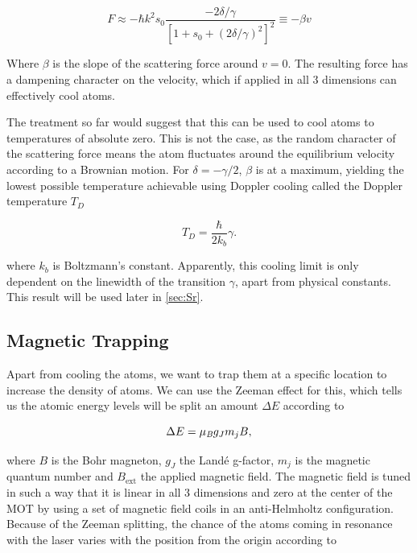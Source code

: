 \begin{equation}\label{eq:linearize}
	F \approx - \hbar k^2 s_0 \frac{-2\delta/\gamma}{\left[1+s_0+(2\delta/\gamma)^2\right]^2} \equiv -\beta v
\end{equation}

Where $\beta$ is the slope of the scattering force around $v=0$. The resulting force has a dampening character on the velocity, which if applied in all 3 dimensions can effectively cool atoms. 

The treatment so far would suggest that this can be used to cool atoms to temperatures of absolute zero. This is not the case, as the random character of the scattering force means the atom fluctuates around the equilibrium velocity according to a Brownian motion. For $\delta=-\gamma/2$, $\beta$ is at a maximum, yielding the lowest possible temperature achievable using Doppler cooling called the Doppler temperature $T_D$

\begin{equation}\label{eq:DopplerTemperature}
	T_D = \frac{\hbar}{2k_b} \gamma.
\end{equation}

where $k_b$ is Boltzmann's constant. Apparently, this cooling limit is only dependent on the linewidth of the transition $\gamma$, apart from physical constants. This result will be used later in \cref{sec:Sr}.

\subsection{Magnetic Trapping}

Apart from cooling the atoms, we want to trap them at a specific location to increase the density of atoms. We can use the Zeeman effect for this, which tells us the atomic energy levels will be split an amount $\Delta E$ according to \cite{Griffiths2004}

\begin{equation}\label{eq:Zeeman}
	\Delta E = \mu_{\emph{B}} g_J m_j B,
\end{equation}

where $B$ is the Bohr magneton, $g_J$ the Landé g-factor, $m_j$ is the magnetic quantum number and $B_{\text{ext}}$ the applied magnetic field. The magnetic field is tuned in such a way that it is linear in all 3 dimensions and zero at the center of the \ac{MOT} by using a set of magnetic field coils in an anti-Helmholtz configuration. Because of the Zeeman splitting, the chance of the atoms coming in resonance with the laser varies with the position from the origin according to 

